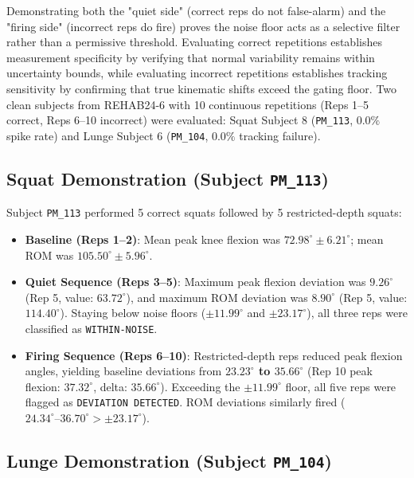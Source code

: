 Demonstrating both the "quiet side" (correct reps do not false-alarm) and the "firing side" (incorrect reps do fire) proves the noise floor acts as a selective filter rather than a permissive threshold. Evaluating correct repetitions establishes measurement specificity by verifying that normal variability remains within uncertainty bounds, while evaluating incorrect repetitions establishes tracking sensitivity by confirming that true kinematic shifts exceed the gating floor. Two clean subjects from REHAB24-6 with 10 continuous repetitions (Reps 1–5 correct, Reps 6–10 incorrect) were evaluated: Squat Subject 8 (\texttt{PM\_113}, $0.0\%$ spike rate) and Lunge Subject 6 (\texttt{PM\_104}, $0.0\%$ tracking failure).

\subsection{Squat Demonstration (Subject \texttt{PM\_113})}
\label{sec:9-3-1-squat-demonstration-subject-texttt-pm-113}

Subject \texttt{PM\_113} performed 5 correct squats followed by 5 restricted-depth squats:
\begin{itemize}
  \item \textbf{Baseline (Reps 1–2)}: Mean peak knee flexion was \textbf{$72.98^\circ \pm 6.21^\circ$}; mean ROM was \textbf{$105.50^\circ \pm 5.96^\circ$}.
  \item \textbf{Quiet Sequence (Reps 3–5)}: Maximum peak flexion deviation was \textbf{$9.26^\circ$} (Rep 5, value: $63.72^\circ$), and maximum ROM deviation was \textbf{$8.90^\circ$} (Rep 5, value: $114.40^\circ$). Staying below noise floors ($\pm 11.99^\circ$ and $\pm 23.17^\circ$), all three reps were classified as \texttt{WITHIN-NOISE}.
  \item \textbf{Firing Sequence (Reps 6–10)}: Restricted-depth reps reduced peak flexion angles, yielding baseline deviations from \textbf{$23.23^\circ$ to $35.66^\circ$} (Rep 10 peak flexion: $37.32^\circ$, delta: $35.66^\circ$). Exceeding the $\pm 11.99^\circ$ floor, all five reps were flagged as \texttt{DEVIATION DETECTED}. ROM deviations similarly fired ($24.34^\circ\text{--}36.70^\circ > \pm 23.17^\circ$).
\end{itemize}

\subsection{Lunge Demonstration (Subject \texttt{PM\_104})}
\label{sec:9-3-2-lunge-demonstration-subject-texttt-pm-104}

